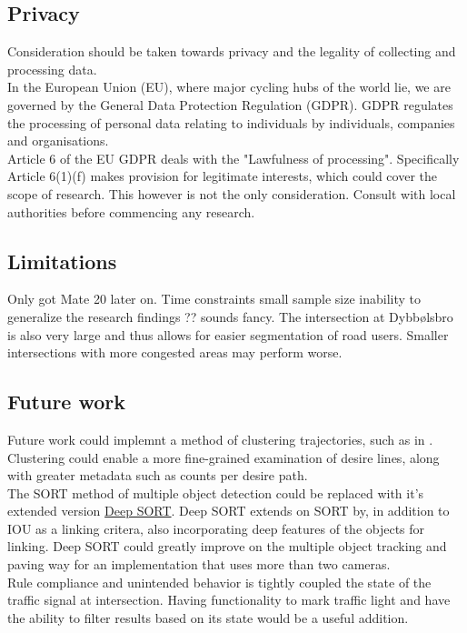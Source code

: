 \subsection{Privacy}

Consideration should be taken towards privacy and the legality of collecting and processing data.
\ \\
In the European Union (EU), where major cycling hubs of the world lie, we are governed by 
the General Data Protection Regulation (GDPR). GDPR regulates the processing of personal data 
relating to individuals by individuals, companies and organisations.
\ \\
Article 6 of the EU GDPR deals with the "Lawfulness of processing". Specifically Article 6(1)(f)
makes provision for legitimate interests, which could cover the scope of research.
This however is not the only consideration. Consult with local authorities before commencing any research.

\subsection{Limitations}
Only got Mate 20 later on.
Time constraints
small sample size
inability to generalize the research findings ?? sounds fancy.
The intersection at Dybbølsbro is also very large and thus allows for easier segmentation of road users. 
Smaller intersections with more congested areas may perform worse. 
\ \\

\subsection{Future work}

Future work could implemnt a method of clustering trajectories,
such as in \cite{gariel_trajectory_2011}. Clustering could enable a more fine-grained examination of desire lines,
along with greater metadata such as counts per desire path.
\ \\

The SORT method of multiple object detection could be replaced with it's extended version \href{https://github.com/nwojke/deep_sort}{Deep SORT}.
Deep SORT extends on SORT by, in addition to IOU as a linking critera, also incorporating
deep features of the objects for linking. Deep SORT could greatly improve on the multiple object tracking
and paving way for an implementation that uses more than two cameras.
\ \\

Rule compliance and unintended behavior is tightly coupled the state of the traffic signal at intersection. 
Having functionality to mark traffic light and have the ability to filter results based on its state would
be a useful addition. 